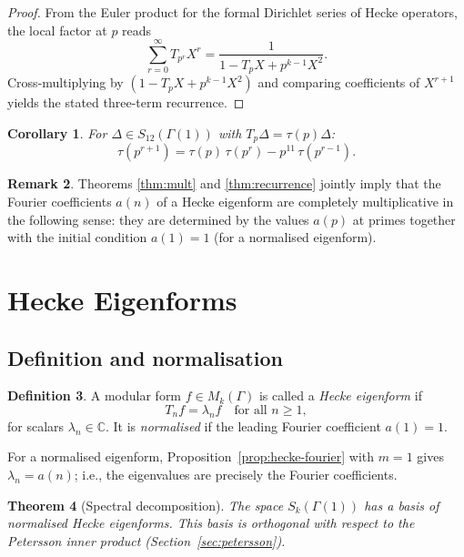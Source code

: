 \documentclass[12pt,a4paper]{amsart}
\newtheorem{theorem}{Theorem}[section]
\newtheorem{corollary}[theorem]{Corollary}
\theoremstyle{definition}
\newtheorem{definition}[theorem]{Definition}
\newtheorem{remark}[theorem]{Remark}
\begin{document}
\begin{proof}
  From the Euler product for the formal Dirichlet series of Hecke operators,
  the local factor at $p$ reads
  \[
    \sum_{r=0}^{\infty} T_{p^r} X^r = \frac{1}{1 - T_p X + p^{k-1} X^2}.
  \]
  Cross-multiplying by $(1 - T_p X + p^{k-1} X^2)$ and comparing
  coefficients of $X^{r+1}$ yields the stated three-term recurrence.
\end{proof}

\begin{corollary}
  For $\Delta \in S_{12}(\Gamma(1))$ with $T_p \Delta = \tau(p)\Delta$:
  \[
    \tau(p^{r+1}) = \tau(p)\,\tau(p^r) - p^{11}\,\tau(p^{r-1}).
  \]
\end{corollary}

\begin{remark}
  Theorems \ref{thm:mult} and \ref{thm:recurrence} jointly imply that the
  Fourier coefficients $a(n)$ of a Hecke eigenform are completely multiplicative
  in the following sense: they are determined by the values $a(p)$ at primes
  together with the initial condition $a(1) = 1$ (for a normalised eigenform).
\end{remark}

\section{Hecke Eigenforms}

\subsection{Definition and normalisation}

\begin{definition}
  A modular form $f \in M_k(\Gamma)$ is called a \emph{Hecke eigenform} if
  \[
    T_n f = \lambda_n f \quad \text{for all } n \ge 1,
  \]
  for scalars $\lambda_n \in \mathbb{C}$. It is \emph{normalised} if the
  leading Fourier coefficient $a(1) = 1$.
\end{definition}

For a normalised eigenform, Proposition~\ref{prop:hecke-fourier} with
$m = 1$ gives $\lambda_n = a(n)$; i.e., the eigenvalues are precisely the
Fourier coefficients.

\begin{theorem}[Spectral decomposition]\label{thm:spectral}
  The space $S_k(\Gamma(1))$ has a basis of normalised Hecke eigenforms.
  This basis is orthogonal with respect to the Petersson inner product
  (Section~\ref{sec:petersson}).
\end{theorem}
\end{document}
